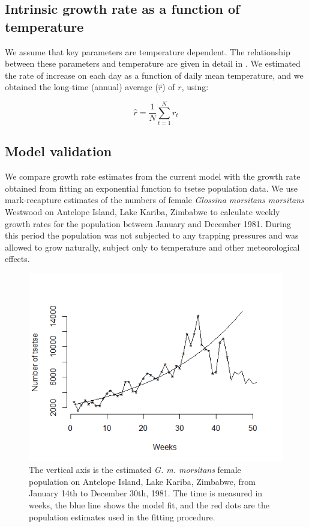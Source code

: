 \documentclass[12pt,a4paper]{article}
\begin{document}
\subsection*{Intrinsic growth rate as a function of temperature}

We assume that key parameters are temperature dependent. The relationship between these parameters and temperature are given in detail in \cite{Are2019}. We estimated the rate of increase on each day as a function of daily mean temperature, and we obtained the long-time (annual) average ($\hat{r}$)  of $r$, using: 

\begin{equation}
\label{equation1010} 
\hat{r} = \frac{1}{N} \sum_{t=1}^{N} r_t
\end{equation}

\subsection*{Model validation}
We compare growth rate estimates from the current model with the growth rate obtained from fitting an exponential function to tsetse population data. We use mark-recapture estimates of the numbers of female \textit{Glossina morsitans morsitans} Westwood on Antelope Island, Lake Kariba, Zimbabwe \cite{hargrove1998optimized} to calculate weekly growth rates for the population between January and December 1981. During this period the population was not subjected to any trapping pressures and was allowed to grow naturally, subject only to temperature and other meteorological effects.

\begin{figure}[hbt!]
	\centering
	\includegraphics[width=0.9\linewidth]{Feb_06_fitGrouwthRate}
	\caption{The vertical axis is the estimated \textit{G. m. morsitans} female population on Antelope Island, Lake Kariba, Zimbabwe, from January 14th to December 30th, 1981. The time is measured in weeks, the blue line shows the model fit, and the red dots are the population estimates used in the fitting procedure.}
	\label{fig:antelopeEst}
\end{figure}
\end{document}
